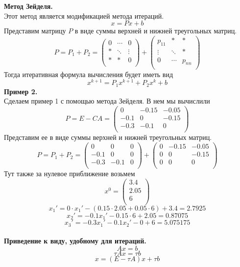 \documentclass[12pt]{article}
\theoremstyle{definition}
\numberwithin{equation}{section}
\begin{document}
	\textbf{Метод Зейделя.}\\
	Этот метод является модификацией метода итераций. 
	$$x=Px+b$$
	Представим матрицу $P$ в виде суммы верхней и нижней треугольных матриц.
	\[P=P_1+P_2= \begin{pmatrix}
	0 & \cdots & 0\\
	* & \ddots & \vdots\\
	* & * & 0\\
	\end{pmatrix} + \begin{pmatrix}
	p_{11} & * & *\\
	\vdots & \ddots & *\\
	0 & \cdots & p_{nn}\\
	\end{pmatrix}\]
	Тогда итеративная формула вычисления будет иметь вид
	$$x^{k+1}=P_1x^{k+1}+P_2x^k+b$$
	\textbf{Пример 2.}\\
	Сделаем пример 1 с помощью метода Зейделя. В нем мы вычислили
	\[P=E-CA=\begin{pmatrix}
	0 & -0.15 & -0.05\\
	-0.1 & 0 & -0.15\\
	-0.3 & -0.1 & 0\\
	\end{pmatrix}\]
	Представим ее в виде суммы верхней и нижней треугольных матриц.
	\[P=P_1+P_2=\begin{pmatrix}
	0 & 0 & 0\\
	-0.1 & 0 & 0\\
	-0.3 & -0.1 & 0\\
	\end{pmatrix} + \begin{pmatrix}
	0 & -0.15 & -0.05\\
	0 & 0 & -0.15\\
	0 & 0 & 0\\
	\end{pmatrix}\]
	Тут также за нулевое приближение возьмем
	\[x^0=\begin{pmatrix}
	3.4\\
	2.05\\
	6\\
	\end{pmatrix}\]
	$$x_1'=0\cdot x_1'-(0.15\cdot 2.05+0.05\cdot 6)+3.4=2.7925$$
	$$x_2'=-0.1x_1'-0.15\cdot 6+2.05=0.87075$$
	$$x_3'=-0.3x_1'-0.1x_2'-0+6=5.075175$$
	\\
	\textbf{Приведение к виду, удобному для итераций.}\\
	$$Ax=b$$
	$$\tau Ax=\tau b$$
	$$x=(E-\tau A)x+\tau b$$
\end{document}
